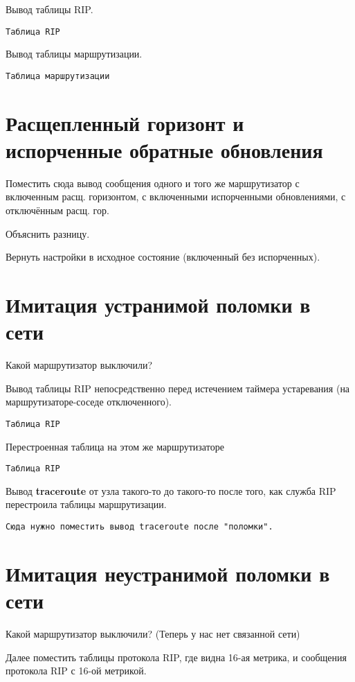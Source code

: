 \documentclass[a4paper,12pt]{article}
\begin{document}
Вывод таблицы RIP.

\begin{Verbatim}
Таблица RIP
\end{Verbatim}

Вывод таблицы маршрутизации.

\begin{Verbatim}
Таблица маршрутизации
\end{Verbatim}

\section{Расщепленный горизонт и испорченные обратные обновления}

Поместить сюда вывод сообщения одного и того же маршрутизатор с включенным расщ. горизонтом, с включенными испорченными обновлениями, с отключённым расщ. гор.

Объяснить разницу.

Вернуть настройки в исходное состояние (включенный без испорченных).

\section{Имитация устранимой поломки в сети}

Какой маршрутизатор выключили?

Вывод таблицы RIP непосредственно перед истечением таймера устаревания (на маршрутизаторе-соседе отключенного).

\begin{Verbatim}
Таблица RIP
\end{Verbatim}

Перестроенная таблица на этом же маршрутизаторе

\begin{Verbatim}
Таблица RIP
\end{Verbatim}


Вывод \textbf{traceroute} от узла такого-то до такого-то после того, как служба RIP перестроила таблицы маршрутизации.

\begin{Verbatim}
Сюда нужно поместить вывод traceroute после "поломки".
\end{Verbatim}

\section{Имитация неустранимой поломки в сети}

Какой маршрутизатор выключили? (Теперь у нас нет связанной сети)

Далее поместить таблицы протокола RIP, где видна 16-ая метрика, и сообщения протокола RIP с 16-ой метрикой.
\end{document}
